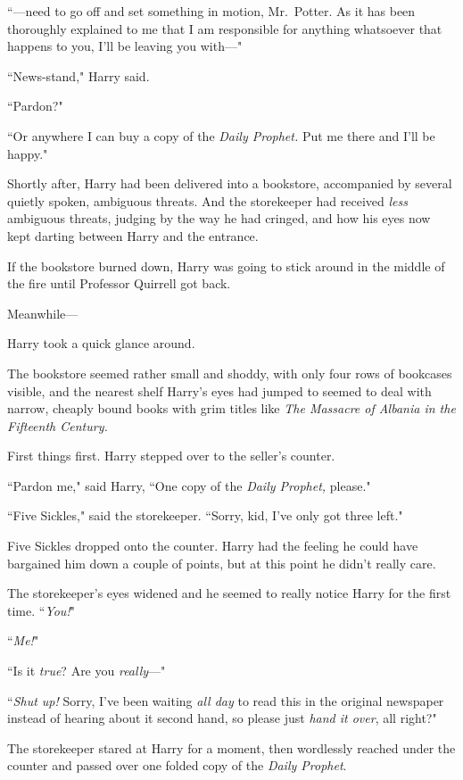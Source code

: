 ``—need to go off and set something in motion, Mr.~Potter. As it has been thoroughly explained to me that I am responsible for anything whatsoever that happens to you, I'll be leaving you with—"

``News-stand," Harry said.

``Pardon?"

``Or anywhere I can buy a copy of the \emph{Daily Prophet.} Put me there and I'll be happy."

Shortly after, Harry had been delivered into a bookstore, accompanied by several quietly spoken, ambiguous threats. And the storekeeper had received \emph{less} ambiguous threats, judging by the way he had cringed, and how his eyes now kept darting between Harry and the entrance.

If the bookstore burned down, Harry was going to stick around in the middle of the fire until Professor Quirrell got back.

Meanwhile—

Harry took a quick glance around.

The bookstore seemed rather small and shoddy, with only four rows of bookcases visible, and the nearest shelf Harry's eyes had jumped to seemed to deal with narrow, cheaply bound books with grim titles like \emph{The Massacre of Albania in the Fifteenth Century.}

First things first. Harry stepped over to the seller's counter.

``Pardon me," said Harry, ``One copy of the \emph{Daily Prophet,} please."

``Five Sickles," said the storekeeper. ``Sorry, kid, I've only got three left."

Five Sickles dropped onto the counter. Harry had the feeling he could have bargained him down a couple of points, but at this point he didn't really care.

The storekeeper's eyes widened and he seemed to really notice Harry for the first time. ``\emph{You!}"

``\emph{Me!}"

``Is it \emph{true}? Are you \emph{really}—"

``\emph{Shut up!} Sorry, I've been waiting \emph{all day} to read this in the original newspaper instead of hearing about it second hand, so please just \emph{hand it over}, all right?"

The storekeeper stared at Harry for a moment, then wordlessly reached under the counter and passed over one folded copy of the \emph{Daily Prophet}.

